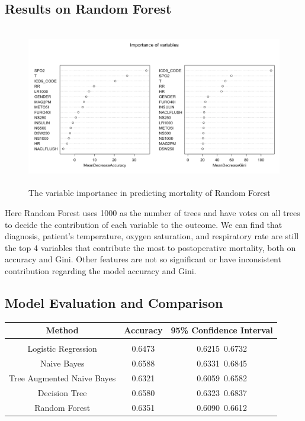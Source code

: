 \documentclass[twoside,11pt]{article}
\begin{document}
\subsection{Results on Random Forest}

\begin{figure}[htbp]
  \centering 
  \includegraphics[height=7cm, width=14cm]{fig8} 
  \caption{The variable importance in predicting mortality of Random Forest}
  \label{fig8} 
\end{figure}

Here Random Forest uses 1000 as the number of trees and have votes on all trees to decide the contribution of each variable to the outcome. We can find that diagnosis, patient's temperature, oxygen saturation, and respiratory rate are still the top 4 variables that contribute the most to postoperative mortality, both on accuracy and Gini. Other features are not so significant or have inconsistent contribution regarding the model accuracy and Gini.

\subsection{Model Evaluation and Comparison}
\begin{table}[htbp]
  \centering 
  \begin{tabular}{|c|c|c|} 
     Method & Accuracy & 95\% Confidence Interval\\ 
    \hline \\[-11pt]
    Logistic Regression & 0.6473 & 0.6215~0.6732\\ 
    Naive Bayes & 0.6588 & 0.6331~0.6845\\ 
    Tree Augmented Naive Bayes & 0.6321 & 0.6059~0.6582\\
    Decision Tree & 0.6580 & 0.6323~0.6837\\
    Random Forest & 0.6351 & 0.6090~0.6612\\ \hline 
  \end{tabular}
\end{table}
\end{document}
